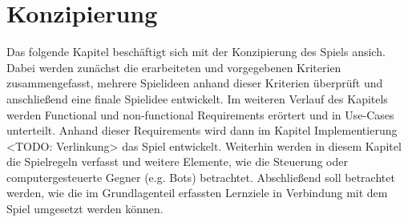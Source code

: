 \section{Konzipierung}
Das folgende Kapitel beschäftigt sich mit der Konzipierung des Spiels ansich. Dabei werden zunächst die erarbeiteten und vorgegebenen Kriterien zusammengefasst, mehrere Spielideen anhand dieser Kriterien überprüft und anschließend eine finale Spielidee entwickelt. Im weiteren Verlauf des Kapitels werden Functional und non-functional Requirements erörtert und in Use-Cases unterteilt. Anhand dieser Requirements wird dann im Kapitel Implementierung <TODO: Verlinkung> das Spiel entwickelt. Weiterhin werden in diesem Kapitel die Spielregeln verfasst und weitere Elemente, wie die Steuerung oder computergesteuerte Gegner (e.g. Bots) betrachtet. Abschließend soll betrachtet werden, wie die im Grundlagenteil erfassten Lernziele in Verbindung mit dem Spiel umgesetzt werden können.
